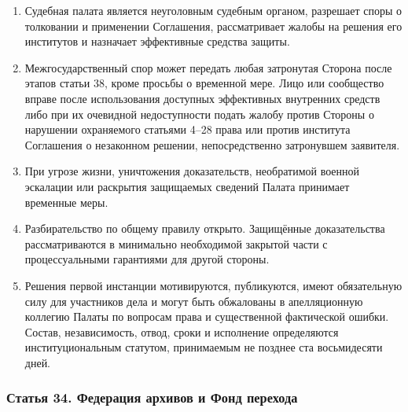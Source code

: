 \documentclass[
  russian,
  11pt,
  a4paper,
]{article}
\providecommand{\tightlist}{%
  \setlength{\itemsep}{0pt}\setlength{\parskip}{0pt}}
\begin{document}
\begin{enumerate}
\def\labelenumi{\arabic{enumi}.}
\tightlist
\item
  Судебная палата является неуголовным судебным органом, разрешает споры
  о толковании и применении Соглашения, рассматривает жалобы на решения
  его институтов и назначает эффективные средства защиты.
\item
  Межгосударственный спор может передать любая затронутая Сторона после
  этапов статьи 38, кроме просьбы о временной мере. Лицо или сообщество
  вправе после использования доступных эффективных внутренних средств
  либо при их очевидной недоступности подать жалобу против Стороны о
  нарушении охраняемого статьями 4--28 права или против института
  Соглашения о незаконном решении, непосредственно затронувшем
  заявителя.
\item
  При угрозе жизни, уничтожения доказательств, необратимой военной
  эскалации или раскрытия защищаемых сведений Палата принимает временные
  меры.
\item
  Разбирательство по общему правилу открыто. Защищённые доказательства
  рассматриваются в минимально необходимой закрытой части с
  процессуальными гарантиями для другой стороны.
\item
  Решения первой инстанции мотивируются, публикуются, имеют обязательную
  силу для участников дела и могут быть обжалованы в апелляционную
  коллегию Палаты по вопросам права и существенной фактической ошибки.
  Состав, независимость, отвод, сроки и исполнение определяются
  институциональным статутом, принимаемым не позднее ста восьмидесяти
  дней.
\end{enumerate}

\subsubsection{Статья 34. Федерация архивов и Фонд
перехода}\label{ux441ux442ux430ux442ux44cux44f-34-ux444ux435ux434ux435ux440ux430ux446ux438ux44f-ux430ux440ux445ux438ux432ux43eux432-ux438-ux444ux43eux43dux434-ux43fux435ux440ux435ux445ux43eux434ux430}
\end{document}

